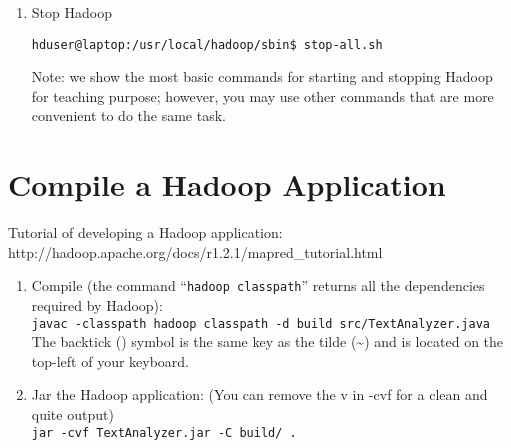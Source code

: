 \documentclass[11pt]{article}
\begin{document}
\begin{enumerate}
\item Stop Hadoop
\vspace{-.15in}\begin{verbatim}
hduser@laptop:/usr/local/hadoop/sbin$ stop-all.sh
\end{verbatim}\vspace{-.15in}



Note: we show the most basic commands for starting and stopping Hadoop for teaching purpose; however, you may use other commands that are more convenient to do the same task.

\end{enumerate}





\section*{Compile a Hadoop Application}
Tutorial of developing a Hadoop application: http://hadoop.apache.org/docs/r1.2.1/mapred\_tutorial.html
\begin{enumerate}
\item Compile (the command ``{\tt hadoop classpath}'' returns all the dependencies required by Hadoop):\\
{\tt javac -classpath \textasciigrave hadoop classpath\textasciigrave\ -d build src/TextAnalyzer.java}\\
The backtick (\textasciigrave) symbol is the same key as the tilde (\textasciitilde) and is located on the top-left of your keyboard.

\item Jar the Hadoop application: (You can remove the v in -cvf for a clean and quite output)\\
{\tt jar -cvf TextAnalyzer.jar -C build/ .}
\end{enumerate}
\end{document}
